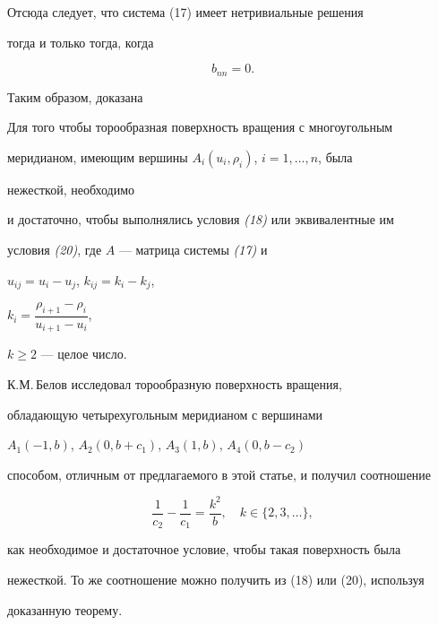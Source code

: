 Отсюда следует, что система (17) имеет нетривиальные решения


тогда и только тогда, когда


\begin{equation}


b_{nn}=0.


\end{equation}





Таким образом, доказана





\begin{thmnonum}


Для того чтобы торообразная поверхность вращения с многоугольным


меридианом, имеющим вершины $A_i(u_i,\rho_i)$, $i=1,\dotsc,n$, была


нежесткой, необходимо


и достаточно, чтобы выполнялись условия {\em (18)} или эквивалентные им


условия {\em (20)}, где $A$ --- матрица системы {\em (17)} и


$u_{ij}=u_i-u_j$, $k_{ij}=k_i-k_j$,


$k_i=\dfrac{\rho_{i+1}-\rho_i}{u_{i+1}-u_i}$,


$k\ge 2$ --- целое число.


\end{thmnonum}





К.М.\,Белов \cite{Bel} исследовал торообразную поверхность вращения,


обладающую четырехугольным меридианом с вершинами


$A_1(-1,b)$, $A_2(0,b+c_1)$, $A_3(1,b)$, $A_4(0,b-c_2)$


способом, отличным от предлагаемого в этой статье, и получил соотношение


$$


\frac{1}{c_2}-\frac{1}{c_1}=\frac{k^2}{b},\quad


k\in\{2,3,\dotsc\},


$$


как необходимое и достаточное условие, чтобы такая поверхность была


нежесткой. То же соотношение можно получить из (18) или (20), используя


доказанную теорему.





